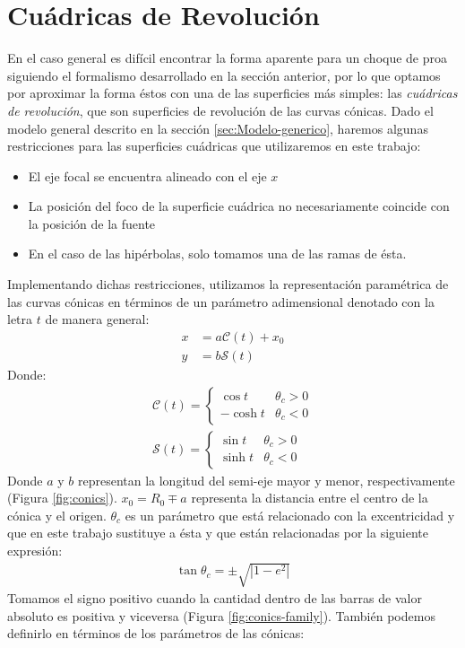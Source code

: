\section{Cuádricas de Revolución}

\newcommand\Sin{\ensuremath{\mathcal{S}}}
\newcommand\Cos{\ensuremath{\mathcal{C}}}
\newcommand\Cot{\ensuremath{\mathcal{T}}}


En el caso general es difícil encontrar la forma aparente para un choque de
proa siguiendo el formalismo desarrollado en la sección anterior, por lo que
optamos por aproximar la forma éstos con una de las superficies más simples:
las \textit{cuádricas de revolución}, que son superficies de revolución de
las curvas cónicas. Dado el modelo general descrito en la sección
\ref{sec:Modelo-generico}, haremos algunas restricciones para las superficies
cuádricas que utilizaremos en este trabajo:
\begin{itemize}
  \item El eje focal se encuentra alineado con el eje $x$
  \item La posición del foco de la superficie cuádrica no necesariamente coincide
    con la posición de la fuente
  \item En el caso de las hipérbolas, solo tomamos una de las ramas de ésta.
\end{itemize}
Implementando dichas restricciones, utilizamos la representación paramétrica de
las curvas cónicas en términos de un parámetro adimensional denotado con la letra
$t$ de manera general:
\begin{align}
  x &= a\Cos(t) + x_0\\
  y &= b\Sin(t) 
\end{align}
Donde:
\begin{align}
  \Cos(t) =\left\lbrace
  \begin{array}{lr}
    \cos{t} & \theta_c > 0\\
    -\cosh{t} & \theta_c < 0        
  \end{array}\right. \\
  \Sin(t) = \left\lbrace
  \begin{array}{lr}
    \sin{t} & \theta_c > 0\\
    \sinh{t}  & \theta_c < 0
  \end{array} \right.
\end{align}
Donde $a$ y $b$ representan la longitud del semi-eje mayor y menor, respectivamente (Figura \ref{fig:conics}).
$x_0 = R_0 \mp a$ representa la distancia entre el centro de la cónica y el origen. 
$\theta_c$ es un parámetro que está relacionado con la excentricidad y que en este
trabajo sustituye a ésta y que están relacionadas por la siguiente expresión:
\begin{align}
  \tan\theta_c = \pm\sqrt{\left|1-e^2\right|}
\end{align}
Tomamos el signo positivo cuando la cantidad dentro de las barras de valor absoluto es
positiva y viceversa (Figura \ref{fig:conics-family}). También podemos definirlo en
términos de los parámetros de las cónicas:

